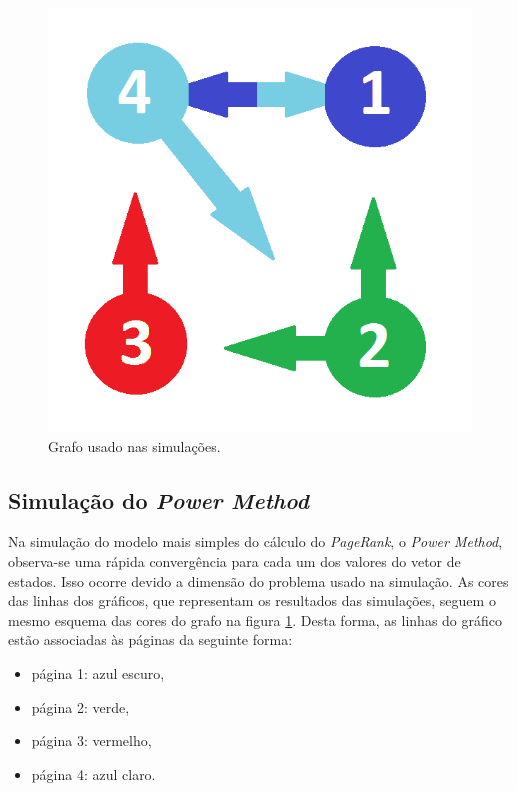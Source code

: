 \documentclass[a4paper]{report} %
\begin{document}
\begin{figure}[!htb]
	\centering
	\includegraphics[scale=0.3]{imagens/grafo}
	\caption{Grafo usado nas simulações.}
	\label{grafoSimu}
\end{figure}

\subsection*{Simulação do \textit{Power Method}}

Na simulação do modelo mais simples do cálculo do \textit{PageRank}, o \textit{Power Method}, observa-se uma rápida convergência para cada um dos valores do vetor de estados. Isso ocorre devido a dimensão do problema usado na simulação. As cores das linhas dos gráficos, que representam os resultados das simulações, seguem o mesmo esquema das cores do grafo na figura \ref{grafoSimu}. Desta forma, as linhas do gráfico estão associadas às páginas da seguinte forma: 

\begin{itemize}
\item página 1: azul escuro,
\item página 2: verde,
\item página 3: vermelho,
\item página 4: azul claro.
\end{itemize}
\end{document}
